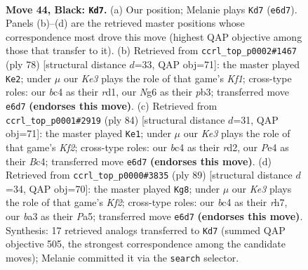 \documentclass[11pt]{article}
\begin{document}
\clearpage

\begin{figure}[p]\centering
\begin{subfigure}{0.46\textwidth}\centering
\resizebox{\linewidth}{!}{%
\newchessgame
\chessboard[
  setfen={3r4/p7/Pp2k1nb/5p2/2B1pP2/B7/5K2/1R6 b - - 21 44},
  showmover=false,
  pgfstyle=straightmove, color=movearrow, markmove={e6-d7}
]}
\caption{}
\end{subfigure}\hfill
\begin{subfigure}{0.46\textwidth}\centering
\resizebox{\linewidth}{!}{%
\newchessgame
\chessboard[
  setfen={8/5kb1/1R6/5pBp/8/1p4P1/1P3P1P/3r1K2 w - - 10 40},
  showmover=false,
  pgfstyle=straightmove, color=movearrow, markmove={f1-e2}
]}
\caption{}
\end{subfigure}
\\[4pt]
\begin{subfigure}{0.46\textwidth}\centering
\resizebox{\linewidth}{!}{%
\newchessgame
\chessboard[
  setfen={8/6pk/5p2/R6p/2B1Pb1P/5P2/3r1KP1/8 w - - 1 43},
  showmover=false,
  pgfstyle=straightmove, color=movearrow, markmove={f2-e1}
]}
\caption{}
\end{subfigure}\hfill
\begin{subfigure}{0.46\textwidth}\centering
\resizebox{\linewidth}{!}{%
\newchessgame
\chessboard[
  setfen={8/2p1Pk1R/1p6/p4p2/b1p2B2/1nP3P1/8/6K1 b - - 0 45},
  showmover=false,
  pgfstyle=straightmove, color=movearrow, markmove={f7-g8}
]}
\caption{}
\end{subfigure}
\caption{\textbf{Move 44, Black: \texttt{Kd7}.} (a) Our position; Melanie plays \texttt{Kd7} (\texttt{e6d7}). Panels (b)--(d) are the retrieved master positions whose correspondence most drove this move (highest QAP objective among those that transfer to it). (b) Retrieved from \texttt{ccrl\_top\_p0002\#1467} (ply 78) [structural distance $d$=33, QAP obj=71]: the master played \texttt{Ke2}; under $\mu$ our \emph{Ke3} plays the role of that game's \emph{Kf1}; cross-type roles: our \emph{b}c4 as their \emph{r}d1, our \emph{N}g6 as their \emph{p}b3; transferred move \texttt{e6d7} \textbf{(endorses this move)}. (c) Retrieved from \texttt{ccrl\_top\_p0001\#2919} (ply 84) [structural distance $d$=31, QAP obj=71]: the master played \texttt{Ke1}; under $\mu$ our \emph{Ke3} plays the role of that game's \emph{Kf2}; cross-type roles: our \emph{b}c4 as their \emph{r}d2, our \emph{P}e4 as their \emph{B}c4; transferred move \texttt{e6d7} \textbf{(endorses this move)}. (d) Retrieved from \texttt{ccrl\_top\_p0000\#3835} (ply 89) [structural distance $d$=34, QAP obj=70]: the master played \texttt{Kg8}; under $\mu$ our \emph{Ke3} plays the role of that game's \emph{Kf2}; cross-type roles: our \emph{b}c4 as their \emph{r}h7, our \emph{b}a3 as their \emph{P}a5; transferred move \texttt{e6d7} \textbf{(endorses this move)}. Synthesis: 17 retrieved analogs transferred to \texttt{Kd7} (summed QAP objective 505, the strongest correspondence among the candidate moves); Melanie committed it via the \texttt{search} selector.}
\label{fig:thought-m87}
\end{figure}
\end{document}
